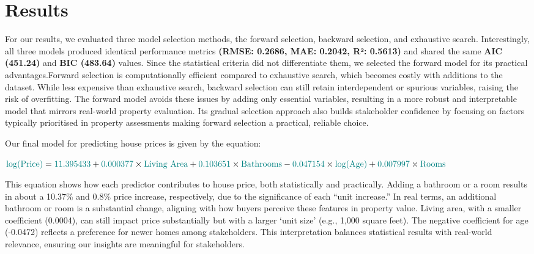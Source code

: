 \documentclass[
  twocolumn]{article}
\begin{document}
\section{Results}\label{results}

For our results, we evaluated three model selection methods, the forward
selection, backward selection, and exhaustive search. Interestingly, all
three models produced identical performance metrics \textbf{(RMSE:
0.2686, MAE: 0.2042, R²: 0.5613)} and shared the same \textbf{AIC
(451.24)} and \textbf{BIC (483.64)} values. Since the statistical
criteria did not differentiate them, we selected the forward model for
its practical advantages.Forward selection is computationally efficient
compared to exhaustive search, which becomes costly with additions to
the dataset. While less expensive than exhaustive search, backward
selection can still retain interdependent or spurious variables, raising
the risk of overfitting. The forward model avoids these issues by adding
only essential variables, resulting in a more robust and interpretable
model that mirrors real-world property evaluation. Its gradual selection
approach also builds stakeholder confidence by focusing on factors
typically prioritised in property assessments making forward selection a
practical, reliable choice.

Our final model for predicting house prices is given by the equation:

\(\textcolor{teal}{\log(\text{Price})} = \textcolor{teal}{11.395433} + \textcolor{teal}{0.000377} \times \textcolor{teal}{\text{Living Area}} + \textcolor{teal}{0.103651} \times \textcolor{teal}{\text{Bathrooms}} - \textcolor{teal}{0.047154} \times \textcolor{teal}{\log(\text{Age})} + \textcolor{teal}{0.007997} \times \textcolor{teal}{\text{Rooms}}\)

This equation shows how each predictor contributes to house price, both
statistically and practically. Adding a bathroom or a room results in
about a 10.37\% and 0.8\% price increase, respectively, due to the
significance of each ``unit increase.'' In real terms, an additional
bathroom or room is a substantial change, aligning with how buyers
perceive these features in property value. Living area, with a smaller
coefficient (0.0004), can still impact price substantially but with a
larger `unit size' (e.g., 1,000 square feet). The negative coefficient
for age (-0.0472) reflects a preference for newer homes among
stakeholders. This interpretation balances statistical results with
real-world relevance, ensuring our insights are meaningful for
stakeholders.
\end{document}
